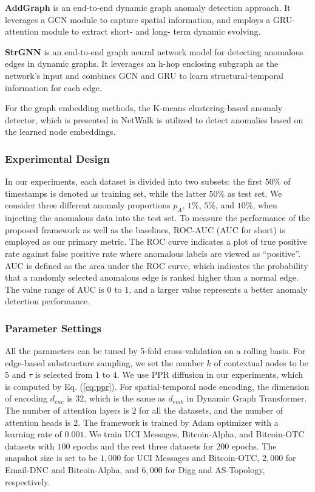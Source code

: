 \documentclass[10pt,journal,compsoc]{IEEEtran}
\newcommand{\HL}{}
\begin{document}
\HL{\textbf{AddGraph} \cite{zheng2019addgraph} is an end-to-end dynamic graph anomaly detection approach. It leverages a GCN module to capture spatial information, and employs a GRU-attention module to extract short- and long- term dynamic evolving.}

\textbf{StrGNN} \cite{cai2020structural} is an end-to-end graph neural network model for detecting anomalous edges in dynamic graphs. It leverages an h-hop enclosing subgraph as the network's input and combines GCN and GRU to learn structural-temporal information for each edge. 

For the graph embedding methods, the K-means clustering-based anomaly detector, which is presented in NetWalk \cite{yu2018netwalk} is utilized to detect anomalies based on the learned node embeddings.

\subsubsection{Experimental Design} 
In our experiments, each dataset is divided into two subsets: the first $50\%$ of timestamps is denoted as training set, while the latter $50\%$ as test set. We consider three different anomaly proportions \HL{$p_A$}, $1\%$, $5\%$, and $10\%$, when injecting the anomalous data into the test set. To measure the performance of the proposed framework as well as the baselines, ROC-AUC (AUC for short) is employed as our primary metric. The ROC curve indicates a plot of true positive rate against false positive rate where anomalous labels are viewed as ``positive''. AUC is defined as the area under the ROC curve, which indicates the probability that a randomly selected anomalous edge is ranked higher than a normal edge. The value range of AUC is $0$ to $1$, and a larger value represents a \HL{better} anomaly detection performance. 

\subsubsection{Parameter Settings} 
All the parameters can be tuned by 5-fold cross-validation on a rolling basis. For edge-based substructure sampling, we set the number $k$ of contextual nodes to be $5$ and $\tau$ is selected from $1$ to $4$. We use PPR diffusion in \HL{our experiments}, which is computed by Eq. (\ref{eq:ppr}). For spatial-temporal node encoding, the dimension of encoding $d_{enc}$ is $32$, which is the same as $d_{emb}$ in Dynamic Graph Transformer. The number of attention layers is $2$ for all the datasets, and the number of attention heads is $2$. The framework is trained by Adam optimizer with a learning rate of $0.001$. We train UCI Messages, Bitcoin-Alpha, and Bitcoin-OTC datasets with $100$ epochs and \HL{the rest three} datasets for $200$ epochs. The snapshot size is set to be $1,000$ for UCI Messages and Bitcoin-OTC, $2,000$ for \HL{Email-DNC and} Bitcoin-Alpha, and $6,000$ for Digg \HL{and AS-Topology}, respectively. 
\end{document}
